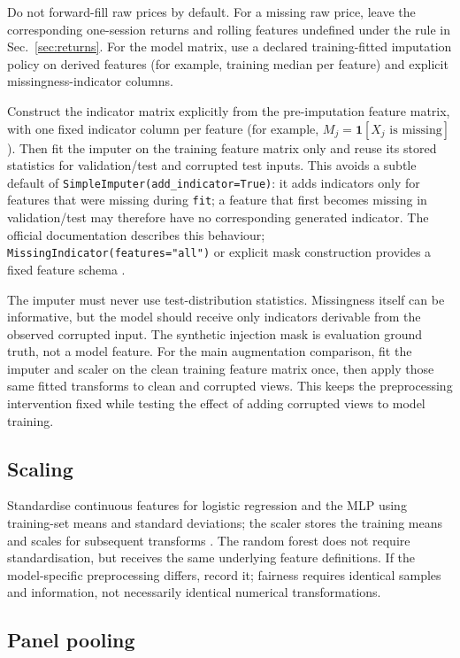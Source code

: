 \documentclass[11pt,a4paper]{article}
\begin{document}
Do not forward-fill raw prices by default. For a missing raw price, leave the corresponding one-session returns and rolling features undefined under the rule in Sec.~\ref{sec:returns}. For the model matrix, use a declared training-fitted imputation policy on derived features (for example, training median per feature) and explicit missingness-indicator columns.

Construct the indicator matrix explicitly from the pre-imputation feature matrix, with one fixed indicator column per feature (for example, $M_{j}=\mathbf{1}[X_j\text{ is missing}]$). Then fit the imputer on the training feature matrix only and reuse its stored statistics for validation/test and corrupted test inputs. This avoids a subtle default of \texttt{SimpleImputer(add\_indicator=True)}: it adds indicators only for features that were missing during \texttt{fit}; a feature that first becomes missing in validation/test may therefore have no corresponding generated indicator. The official documentation describes this behaviour; \texttt{MissingIndicator(features="all")} or explicit mask construction provides a fixed feature schema \cite{SimpleImputerDocs,MissingIndicatorDocs}.

The imputer must never use test-distribution statistics. Missingness itself can be informative, but the model should receive only indicators derivable from the observed corrupted input. The synthetic injection mask is evaluation ground truth, not a model feature. For the main augmentation comparison, fit the imputer and scaler on the clean training feature matrix once, then apply those same fitted transforms to clean and corrupted views. This keeps the preprocessing intervention fixed while testing the effect of adding corrupted views to model training.

\subsection{Scaling}

Standardise continuous features for logistic regression and the MLP using training-set means and standard deviations; the scaler stores the training means and scales for subsequent transforms \cite{StandardScalerDocs}. The random forest does not require standardisation, but receives the same underlying feature definitions. If the model-specific preprocessing differs, record it; fairness requires identical samples and information, not necessarily identical numerical transformations.

\subsection{Panel pooling}
\end{document}
